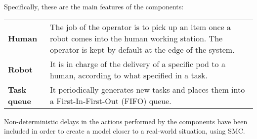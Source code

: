\noindent Specifically, these are the main features of the components:
\vspace{0,5cm}

\begin{tabularx}{\textwidth}{lX}
\textbf{Human} & The job of the operator is to pick up an item once a robot comes into the human working station. The operator is kept by default at the edge of the system.\vspace{0,2cm}\\
\textbf{Robot} & It is in charge of the delivery of a specific pod to a human, according to what specified in a task.\vspace{0,2cm}\\
\textbf{Task queue} & It periodically generates new tasks and places them into a First-In-First-Out (FIFO) queue.\vspace{0,2cm}\\
\end{tabularx}

Non-deterministic delays in the actions performed by the components have been included in order to create a model closer to a real-world situation, using \UPPAAL SMC.